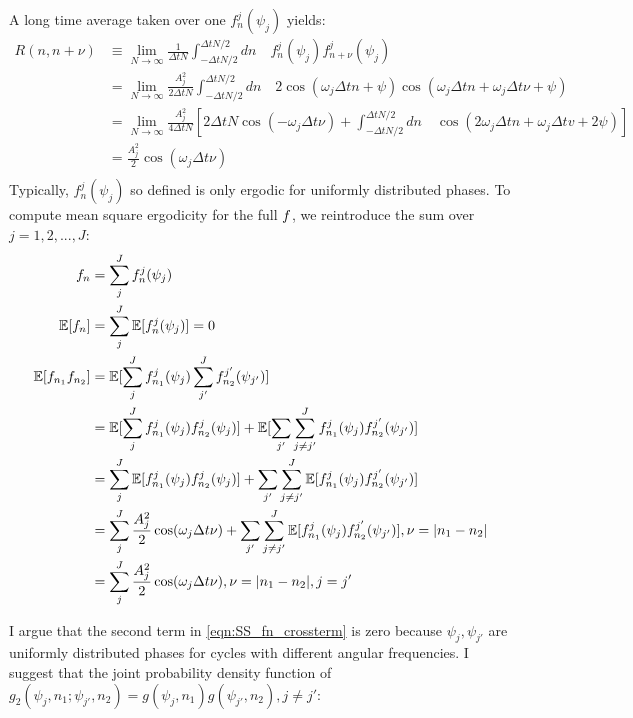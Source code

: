 A long time average taken over one $f^j_n(\psi_j)$ yields:
\begin{align}
R(n, n + \nu)  & \equiv \lim_{N \to \infty} \frac{1}{\Delta t N} \int_{-\Delta t N/2}^{\Delta t N/2} dn \quad  f^j_n(\psi_j) f^j_{n + \nu}(\psi_j)   \\
& = \lim_{N \to \infty} \frac{A_j^2}{2 \Delta t N} \int_{-\Delta t N/2}^{\Delta t N/2} dn \quad 2 \cos(\omega_j \Delta t n + \psi) \cos(\omega_j \Delta t n + \omega_j \Delta t \nu + \psi) \\
& = \lim_{N \to \infty} \frac{A_j^2}{4 \Delta t N} [ 2\Delta t N\cos(-\omega_j \Delta t \nu)   + \int_{-\Delta t N/2}^{\Delta t N/2} dn \quad \cos(2\omega_j \Delta t n + \omega_j \Delta t v + 2\psi) ]\\
& =  \frac{A_j^2}{2} \cos(\omega_j \Delta t \nu) \\
\end{align}
Typically, $f^j_n(\psi_j)$ so defined is only ergodic for uniformly distributed phases. To compute mean square ergodicity for the full $f$, we reintroduce the sum over $j = 1, 2, ... , J$:
\begin{align}
f_n & = \sum_j^J f^j_n(\psi_j) \\
\mathbb{E}[f_n] &= \sum_j^J \mathbb{E}[f^j_n(\psi_j)] = 0 \\
\mathbb{E}[f_{n_1}f_{n_2}] &=  \mathbb{E}[\sum_j^J f^j_{n_1}(\psi_j) \sum_{j'}^{J} f^{j'}_{n_2}(\psi_{j'})]  \\
 & = \mathbb{E}[\sum_j^J f^j_{n_1}(\psi_j) f^j_{n_2} (\psi_j)] + \mathbb{E}[\sum_{j'}\sum_{j\neq j'}^J f^j_{n_1}(\psi_j) f^{j'}_{n_2}(\psi_{j'})] \\
  & = \sum_j^J \mathbb{E}[f^j_{n_1}(\psi_j) f^j_{n_2}(\psi_j)] + \sum_{j'}\sum_{j\neq j'}^J \mathbb{E}[f^j_{n_1}(\psi_j) f^{j'}_{n_2}(\psi_{j'})] \\
 & = \sum_j^J \frac{A_j^2}{2} \cos(\omega_j \Delta t \nu) + \sum_{j'}\sum_{j\neq j'}^J \mathbb{E}[f^j_{n_1}(\psi_j) f^{j'}_{n_2}(\psi_{j'})], \nu = |n_1 - n_2 |  \label{eqn:SS_fn_crossterm}\\
 & = \sum_j^J \frac{A_j^2}{2} \cos(\omega_j \Delta t \nu), \nu  = |n_1 - n_2 |, j = j'
\end{align}
 
 I argue that the second term in \ref{eqn:SS_fn_crossterm} is zero because $\psi_j, \psi_{j'}$ are uniformly distributed phases for cycles with different angular frequencies.
 I suggest that the joint probability density function of $ g_2(\psi_j, n_1; \psi_{j'}, n_2) = g(\psi_j, n_1) g(\psi_{j'}, n_2), j \neq j'$:

